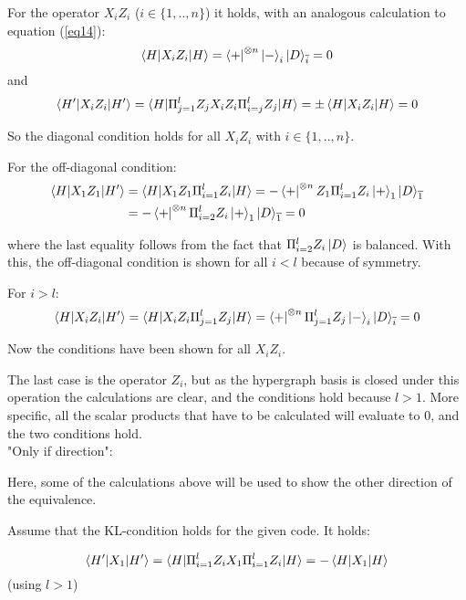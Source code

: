 \documentclass[12pt]{iopart}
\begin{document}
For the operator $X_iZ_i$ ($i \in \{1,..,n\}$) it holds, with an analogous calculation to equation (\ref{eq14}):
\begin{equation}
\braket{H|X_iZ_i|H} = \bra{+}^{\otimes n}\ket{-}_i\ket{D}_{\overline{i}} = 0
\end{equation}
and 
\begin{equation}
\braket{H^{\prime}|X_iZ_i|H^{\prime}} = \braket{H|\Pi_{j=1}^l Z_j X_iZ_i \Pi_{i=j}^l Z_j|H} = \pm \braket{H|X_iZ_i|H} = 0
\end{equation}

So the diagonal condition holds for all $X_iZ_i$ with $i \in \{1,..,n\}$.

For the off-diagonal condition:
\begin{eqnarray}
\braket{H|X_1Z_1|H^\prime} &= \braket{H|X_1Z_1\Pi_{i=1}^l Z_i|H} = -\bra{+}^{\otimes n}Z_1\Pi_{i=1}^l Z_i\ket{+}_1\ket{D}_{\overline{1}} \nonumber \\
&= -\bra{+}^{\otimes n}\Pi_{i=2}^l Z_i\ket{+}_1\ket{D}_{\overline{1}} = 0
\end{eqnarray}

where the last equality follows from the fact that  $\Pi_{i=2}^{l}Z_i\ket{D}$ is balanced. With this, the off-diagonal condition is shown for all $i<l$ because of symmetry. 

For $i>l$:
\begin{equation}
\braket{H|X_iZ_i|H^\prime} = \braket{H|X_iZ_i\Pi_{j=1}^l Z_j|H} = \bra{+}^{\otimes n}\Pi_{j=1}^l Z_j\ket{-}_i\ket{D}_{\overline{i}} = 0
\end{equation}

Now the conditions have been shown for all $X_iZ_i$.

The last case is the operator $Z_i$, but as the hypergraph basis is closed under this operation the calculations are clear, and the conditions hold because $l>1$. More specific, all the scalar products that have to be calculated will evaluate to 0, and the two conditions hold.
\\

"Only if direction":

Here, some of the calculations above will be used to show the other direction of the equivalence. 

Assume that the KL-condition holds for the given code.
It holds:

\begin{equation}
\braket{H^{\prime}|X_1|H^{\prime}} = \braket{H|\Pi_{i=1}^l Z_i X_1 \Pi_{i=1}^l Z_i|H} = - \braket{H|X_1|H}
\end{equation}
(using $l>1$)
\end{document}
